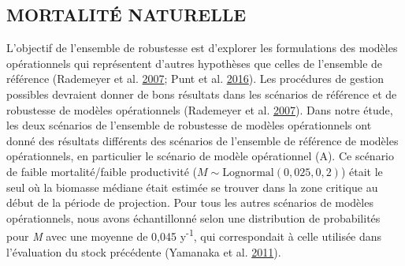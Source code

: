 \documentclass[11pt]{book}
\begin{document}
\hypertarget{sec:discussion-m}{%
\subsection{MORTALITÉ NATURELLE}\label{sec:discussion-m}}

L'objectif de l'ensemble de robustesse est d'explorer les formulations des modèles opérationnels qui représentent d'autres hypothèses que celles de l'ensemble de référence (Rademeyer et al. \protect\hyperlink{ref-rademeyer2007}{2007}; Punt et al. \protect\hyperlink{ref-punt2016}{2016}). Les procédures de gestion possibles devraient donner de bons résultats dans les scénarios de référence et de robustesse de modèles opérationnels (Rademeyer et al. \protect\hyperlink{ref-rademeyer2007}{2007}). Dans notre étude, les deux scénarios de l'ensemble de robustesse de modèles opérationnels ont donné des résultats différents des scénarios de l'ensemble de référence de modèles opérationnels, en particulier le scénario de modèle opérationnel (A). Ce scénario de faible mortalité/faible productivité (\(M \sim \textrm{Lognormal}(0,025, 0,2)\)) était le seul où la biomasse médiane était estimée se trouver dans la zone critique au début de la période de projection. Pour tous les autres scénarios de modèles opérationnels, nous avons échantillonné selon une distribution de probabilités pour \emph{M} avec une moyenne de 0,045 y\textsuperscript{-1}, qui correspondait à celle utilisée dans l'évaluation du stock précédente (Yamanaka et al. \protect\hyperlink{ref-yamanaka2011}{2011}).
\end{document}
